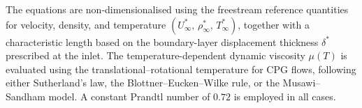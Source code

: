 The equations are non-dimensionalised using the freestream reference quantities for velocity, density, and temperature \((U_\infty^*,\,\rho_\infty^*,\,T_\infty^*)\), together with a characteristic length based on the boundary-layer displacement thickness \(\delta^{*}\) prescribed at the inlet. The temperature-dependent dynamic viscosity \(\mu(T)\) is evaluated using the translational--rotational temperature for \gls{CPG} flows, following either Sutherland’s law, the Blottner--Eucken--Wilke rule, or the Musawi--Sandham model. A constant Prandtl number of \(0.72\) is employed in all cases. 











